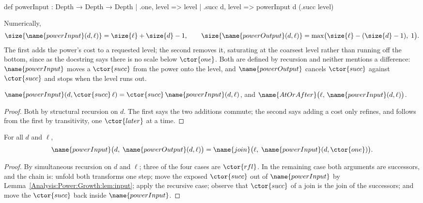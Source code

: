 \begin{leancode}
def powerInput : Depth → Depth → Depth
  | .one, level => level
  | .succ d, level => powerInput d (.succ level)
\end{leancode}

Numerically,
\[
  \size{\name{powerInput}(d,\ell)} = \size{\ell} + \size{d} - 1,
  \qquad
  \size{\name{powerOutput}(d,\ell)}
    = \max\bigl(\size{\ell} - (\size{d}-1),\; 1\bigr).
\]
The first adds the power's cost to a requested level; the second removes it,
saturating at the coarsest level rather than running off the bottom, since as
the docstring says there is no scale below $\ctor{one}$.  Both are defined by
recursion and neither mentions a difference: $\name{powerInput}$ moves a
$\ctor{succ}$ from the power onto the level, and $\name{powerOutput}$ cancels
$\ctor{succ}$ against $\ctor{succ}$ and stops when the level runs out.

\begin{lemma}
\label{Analysis:Power:Growth:lem:input}
$\name{powerInput}(d, \ctor{succ}\,\ell) =
 \ctor{succ}\,\name{powerInput}(d,\ell)$, and
$\name{AtOrAfter}\bigl(\ell,\, \name{powerInput}(d,\ell)\bigr)$.
\end{lemma}

\begin{proof}
Both by structural recursion on $d$.  The first says the two additions
commute; the second says adding a cost only refines, and follows from the
first by transitivity, one $\ctor{later}$ at a time.
\end{proof}

\begin{theorem}
\label{Analysis:Power:Growth:thm:adjoint}
For all $d$ and $\ell$,
\[
  \name{powerInput}\bigl(d,\; \name{powerOutput}(d,\ell)\bigr)
    = \name{join}\bigl(\ell,\; \name{powerInput}(d, \ctor{one})\bigr).
\]
\end{theorem}

\begin{proof}
By simultaneous recursion on $d$ and $\ell$; three of the four cases are
$\ctor{rfl}$.  In the remaining case both arguments are successors, and the
chain is: unfold both transforms one step; move the exposed $\ctor{succ}$ out
of $\name{powerInput}$ by Lemma~\ref{Analysis:Power:Growth:lem:input}; apply
the recursive case; observe that $\ctor{succ}$ of a join is the join of the
successors; and move the $\ctor{succ}$ back inside $\name{powerInput}$.
\end{proof}

